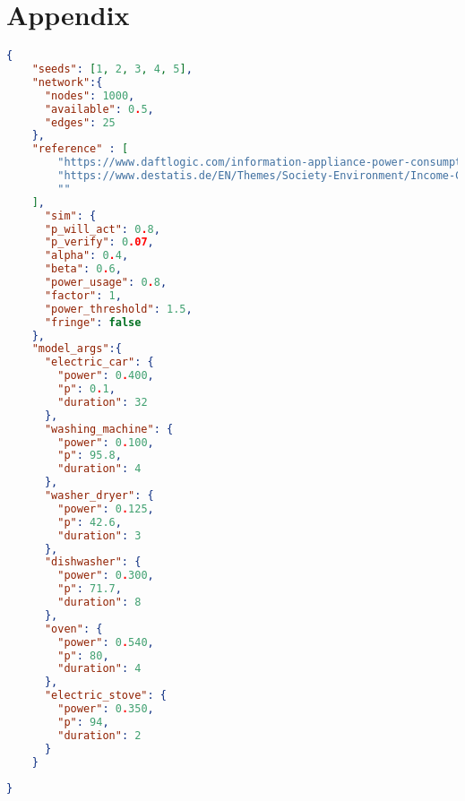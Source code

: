 \chapter{Appendix}

\begin{lstlisting}[language=json,firstnumber=1, 
    caption={Configuration file for scenario 1
    },captionpos=b,label={scenario1config}]
    {
    "seeds": [1, 2, 3, 4, 5],
    "network":{
      "nodes": 1000,
      "available": 0.5,
      "edges": 25
    },
    "reference" : [
        "https://www.daftlogic.com/information-appliance-power-consumption.htm",
        "https://www.destatis.de/EN/Themes/Society-Environment/Income-Consumption-Living-Conditions/Equipment-Consumer-Durables/Tables/liste-equipment-households-electrical--household-appliance-others-germany.html#55702",
        ""
    ],
      "sim": {
      "p_will_act": 0.8,
      "p_verify": 0.07,
      "alpha": 0.4,
      "beta": 0.6,
      "power_usage": 0.8,
      "factor": 1,
      "power_threshold": 1.5,
      "fringe": false
    },
    "model_args":{
      "electric_car": {
        "power": 0.400,
        "p": 0.1,
        "duration": 32
      },
      "washing_machine": {
        "power": 0.100,
        "p": 95.8,
        "duration": 4
      },
      "washer_dryer": {
        "power": 0.125,
        "p": 42.6,
        "duration": 3
      },
      "dishwasher": {
        "power": 0.300,
        "p": 71.7,
        "duration": 8
      },
      "oven": {
        "power": 0.540,
        "p": 80,
        "duration": 4
      },
      "electric_stove": {
        "power": 0.350,
        "p": 94,
        "duration": 2
      }
    }
    
}
\end{lstlisting}